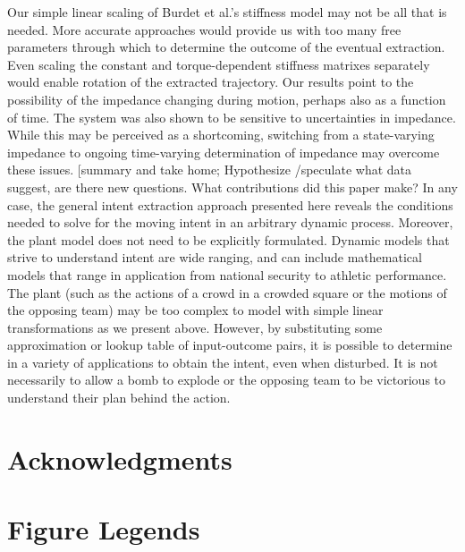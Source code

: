 \documentclass[10pt]{article}
\begin{document}
Our simple linear scaling of Burdet et al.'s stiffness model \cite{burdet2006stability} may not be all that is needed. More accurate approaches would provide us with too many free parameters through which to determine the outcome of the eventual extraction. Even scaling the constant and torque-dependent stiffness matrixes separately would enable rotation of the extracted trajectory. Our results point to the possibility of the impedance changing during motion, perhaps also as a function of time. The system was also shown to be sensitive to uncertainties in impedance. While this may be perceived as a shortcoming, switching from a state-varying impedance to ongoing time-varying determination of impedance may overcome these issues.
[summary and take home; Hypothesize /speculate what data suggest, are there new questions.  What contributions did this paper make? 
In any case, the general intent extraction approach presented here reveals the conditions needed to solve for the moving intent in an arbitrary dynamic process. Moreover, the plant model does not need to be explicitly formulated. Dynamic models that strive to understand intent are wide ranging, and can include mathematical models that range in application from national security to athletic performance. The plant (such as the actions of a crowd in a crowded square or the motions of the opposing team) may be too complex to model with simple linear transformations as we present above. However, by substituting some approximation or lookup table of input-outcome pairs, it is possible to determine in a variety of applications to obtain the intent, even when disturbed. It is not necessarily to allow a bomb to explode or the opposing team to be victorious to understand their plan behind the action.



\section*{Acknowledgments}




\section*{Figure Legends}
\end{document}
